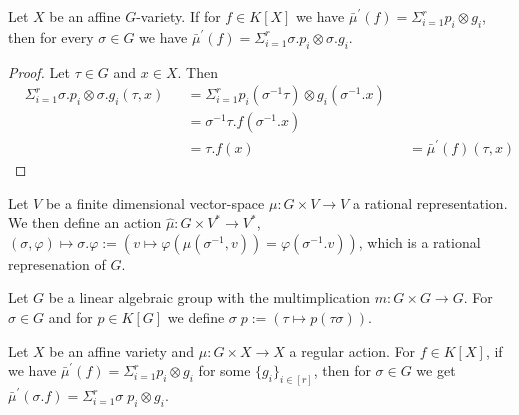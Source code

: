 \begin{proposition}\label{rara}
  Let $X$ be an affine $G$-variety.
  If for $f \in K[X]$ we have $\bar{\mu}^\prime (f) = \Sigma_{i =1}^r p_i \otimes g_i $, then for every $\sigma \in G$ we have $\bar{\mu}^\prime (f) = \Sigma_{i=1}^r \sigma.p_i \otimes \sigma.g_i$.
\end{proposition}

\begin{proof}
  Let $\tau \in G$ and $x \in X$.
  Then
  \begin{equation}
    \begin{aligned}
      &\Sigma_{i=1}^r \sigma.p_i \otimes \sigma.g_i (\tau,x)
      &&= \Sigma_{i=1}^r p_i(\sigma^{-1}\tau) \otimes g_i (\sigma^{-1}.x)  \\
      &&&= \sigma^{-1}\tau.f(\sigma^{-1}.x)  \\
      &&&= \tau.f(x) &&= \bar{\mu}^\prime (f) (\tau,x)
    \end{aligned}
  \end{equation}
\end{proof}

\begin{definition}\label{back}
  Let $V$ be a finite dimensional vector-space $\mu \colon G \times V \longrightarrow V$ a rational representation.
  We then define an action $\hat{\mu} \colon G \times V^\ast \longrightarrow V^\ast$, $ (\sigma,\varphi) \mapsto \sigma.\varphi := (v \mapsto \varphi(\mu(\sigma^{-1},v)) = \varphi(\sigma^{-1}.v))$, which is a rational represenation of $G$.
\end{definition}

\begin{definition}\label{rac}
  Let $G$ be a linear algebraic group with the multimplication $m \colon G \times G \longrightarrow G$.
  For $\sigma \in G$ and for $p \in K[G]$ we define $\sigma\dot{\phantom{.}}p := (\tau \mapsto p(\tau\sigma))$.
\end{definition}

\begin{proposition}\label{roro}
  Let $X$ be an affine variety and $\mu \colon G \times X \longrightarrow X$ a regular action.
  For $f \in K[X]$, if we have $\bar{\mu}^\prime (f) = \Sigma_{i = 1}^r p_i \otimes g_i$ for some $\{g_i\}_{i\in [r]}$, then for $\sigma \in G$ we get $\bar{\mu}^\prime (\sigma.f) = \Sigma_{i = 1}^r \sigma \dot{\phantom{.}} p_i \otimes g_i$.
\end{proposition}

